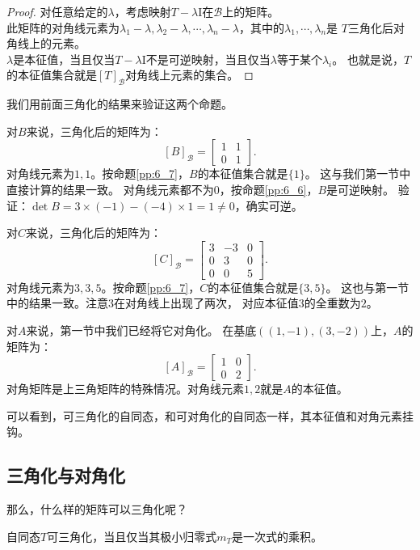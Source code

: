 \documentclass[12pt,UTF8]{ctexbook}
\begin{document}
\begin{proof} %
    对任意给定的$\lambda$，考虑映射$T - \lambda\mathrm{I}$在$\mathcal{B}$上的矩阵。\\
    此矩阵的对角线元素为$\lambda_1 - \lambda, \lambda_2 - \lambda, \cdots , \lambda_n - \lambda$，其中的$\lambda_1, \cdots, \lambda_n$是
    $T$三角化后对角线上的元素。\\
    $\lambda$是本征值，当且仅当$T - \lambda\mathrm{I}$不是可逆映射，当且仅当$\lambda$等于某个$\lambda_i$。
    也就是说，$T$的本征值集合就是$[T]_\mathcal{B}$对角线上元素的集合。

\end{proof}

我们用前面三角化的结果来验证这两个命题。

对$B$来说，三角化后的矩阵为：
$$
[B]_{\mathcal{B}} = \begin{bmatrix} 1 & 1 \\ 0 & 1 \end{bmatrix}.
$$
对角线元素为$1, 1$。按命题\ref{pp:6_7}，$B$的本征值集合就是$\{1\}$。
这与我们第一节中直接计算的结果一致。
对角线元素都不为$0$，按命题\ref{pp:6_6}，$B$是可逆映射。
验证：$\det B = 3 \times (-1) - (-4) \times 1 = 1 \neq 0$，确实可逆。

对$C$来说，三角化后的矩阵为：
$$
[C]_{\mathcal{B}} = \begin{bmatrix} 3 & -3 & 0 \\ 0 & 3 & 0 \\ 0 & 0 & 5 \end{bmatrix}.
$$
对角线元素为$3, 3, 5$。按命题\ref{pp:6_7}，$C$的本征值集合就是$\{3, 5\}$。
这也与第一节中的结果一致。注意$3$在对角线上出现了两次，
对应本征值$3$的全重数为$2$。

对$A$来说，第一节中我们已经将它对角化。
在基底$((1,-1), (3,-2))$上，$A$的矩阵为：
$$
[A]_{\mathcal{B}} = \begin{bmatrix} 1 & 0 \\ 0 & 2 \end{bmatrix}.
$$
对角矩阵是上三角矩阵的特殊情况。对角线元素$1, 2$就是$A$的本征值。

可以看到，可三角化的自同态，和可对角化的自同态一样，其本征值和对角元素挂钩。

\subsection{三角化与对角化}
那么，什么样的矩阵可以三角化呢？

\begin{pp}\label{pp:6_8}
    自同态$T$可三角化，当且仅当其极小归零式$m_T$是一次式的乘积。
\end{pp}
\end{document}
